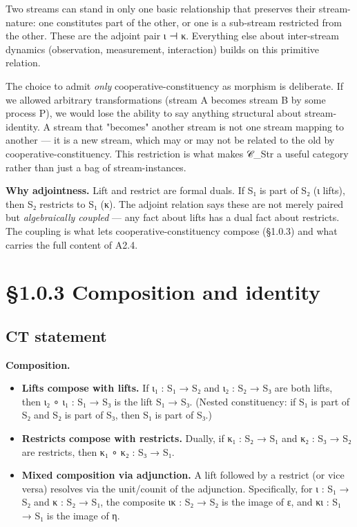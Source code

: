 \documentclass[11pt, openany]{book}
\newcommand{\sectionbreak}{\clearpage}
\begin{document}
Two streams can stand in only one basic relationship that preserves their stream-nature: one constitutes part of the other, or one is a sub-stream restricted from the other. These are the adjoint pair ι ⊣ κ. Everything else about inter-stream dynamics (observation, measurement, interaction) builds on this primitive relation.

The choice to admit \textit{only} cooperative-constituency as morphism is deliberate. If we allowed arbitrary transformations (stream A becomes stream B by some process P), we would lose the ability to say anything structural about stream-identity. A stream that "becomes" another stream is not one stream mapping to another --- it is a new stream, which may or may not be related to the old by cooperative-constituency. This restriction is what makes 𝒞\_\allowbreak{}Str a useful category rather than just a bag of stream-instances.

\textbf{Why adjointness.} Lift and restrict are formal duals. If S₁ is part of S₂ (ι lifts), then S₂ restricts to S₁ (κ). The adjoint relation says these are not merely paired but \textit{algebraically coupled} --- any fact about lifts has a dual fact about restricts. The coupling is what lets cooperative-constituency compose (§1.0.3) and what carries the full content of A2.4.

\sectionbreak

\section{§1.0.3 Composition and identity}

\subsection{CT statement}

\textbf{Composition.}
\begin{itemize}
\item \textbf{Lifts compose with lifts.} If ι₁ : S₁ → S₂ and ι₂ : S₂ → S₃ are both lifts, then ι₂ ∘ ι₁ : S₁ → S₃ is the lift S₁ → S₃. (Nested constituency: if S₁ is part of S₂ and S₂ is part of S₃, then S₁ is part of S₃.)
\item \textbf{Restricts compose with restricts.} Dually, if κ₁ : S₂ → S₁ and κ₂ : S₃ → S₂ are restricts, then κ₁ ∘ κ₂ : S₃ → S₁.
\item \textbf{Mixed composition via adjunction.} A lift followed by a restrict (or vice versa) resolves via the unit/counit of the adjunction. Specifically, for ι : S₁ → S₂ and κ : S₂ → S₁, the composite ικ : S₂ → S₂ is the image of ε, and κι : S₁ → S₁ is the image of η.
\end{itemize}
\end{document}

